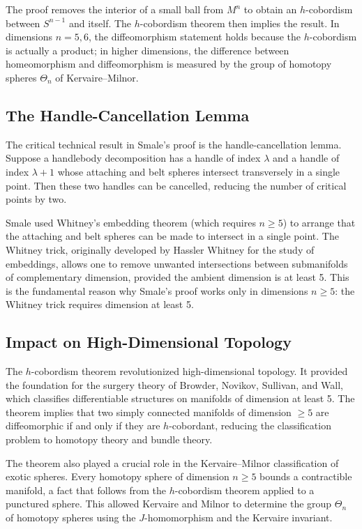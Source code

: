 The proof removes the interior of a small ball from \(M^n\) to obtain an \(h\)-cobordism between \(S^{n-1}\) and itself. The \(h\)-cobordism theorem then implies the result. In dimensions \(n = 5,6\), the diffeomorphism statement holds because the \(h\)-cobordism is actually a product; in higher dimensions, the difference between homeomorphism and diffeomorphism is measured by the group of homotopy spheres \(\Theta_n\) of Kervaire--Milnor.

\subsection{The Handle-Cancellation Lemma}

The critical technical result in Smale's proof is the handle-cancellation lemma. Suppose a handlebody decomposition has a handle of index \(\lambda\) and a handle of index \(\lambda+1\) whose attaching and belt spheres intersect transversely in a single point. Then these two handles can be cancelled, reducing the number of critical points by two.

Smale used Whitney's embedding theorem (which requires \(n \geq 5\)) to arrange that the attaching and belt spheres can be made to intersect in a single point. The Whitney trick, originally developed by Hassler Whitney for the study of embeddings, allows one to remove unwanted intersections between submanifolds of complementary dimension, provided the ambient dimension is at least 5. This is the fundamental reason why Smale's proof works only in dimensions \(n \geq 5\): the Whitney trick requires dimension at least 5.

\subsection{Impact on High-Dimensional Topology}

The \(h\)-cobordism theorem revolutionized high-dimensional topology. It provided the foundation for the surgery theory of Browder, Novikov, Sullivan, and Wall, which classifies differentiable structures on manifolds of dimension at least 5. The theorem implies that two simply connected manifolds of dimension \(\geq 5\) are diffeomorphic if and only if they are \(h\)-cobordant, reducing the classification problem to homotopy theory and bundle theory.

The theorem also played a crucial role in the Kervaire--Milnor classification of exotic spheres. Every homotopy sphere of dimension \(n \geq 5\) bounds a contractible manifold, a fact that follows from the \(h\)-cobordism theorem applied to a punctured sphere. This allowed Kervaire and Milnor to determine the group \(\Theta_n\) of homotopy spheres using the \(J\)-homomorphism and the Kervaire invariant.

